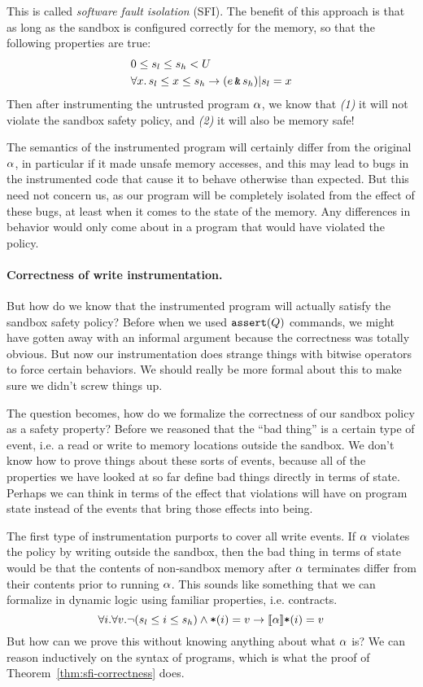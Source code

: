 \documentclass[11pt,twoside]{scrartcl}
\begin{document}
This is called \emph{software fault isolation} (SFI).
The benefit of this approach is that as long as the sandbox is configured correctly for the memory, so that the following properties are true:
\begin{align}
& 0 \le s_l \le s_h < U \\
& \forall x.\, s_l \le x \le s_h \rightarrow (e \operatorname{\texttt{\upshape \&}} s_h) | s_l = x
\end{align}
Then after instrumenting the untrusted program $\alpha$, we know that \emph{(1)} it will not violate the sandbox safety policy, and \emph{(2)} it will also be memory safe! 

The semantics of the instrumented program will certainly differ from the original $\alpha$, in particular if it made unsafe memory accesses, and this may lead to bugs in the instrumented code that cause it to behave otherwise than expected. But this need not concern us, as our program will be completely isolated from the effect of these bugs, at least when it comes to the state of the memory.
Any differences in behavior would only come about in a program that would have violated the policy.

\paragraph{Correctness of write instrumentation.} But how do we know that the instrumented program will actually satisfy the sandbox safety policy? Before when we used $\texttt{\upshape assert}(Q)$ commands, we might have gotten away with an informal argument because the correctness was totally obvious. But now our instrumentation does strange things with bitwise operators to force certain behaviors. We should really be more formal about this to make sure we didn't screw things up.

The question becomes, how do we formalize the correctness of our sandbox policy as a safety property? Before we reasoned that the ``bad thing'' is a certain type of event, i.e. a read or write to memory locations outside the sandbox. We don't know how to prove things about these sorts of events, because all of the properties we have looked at so far define bad things  directly in terms of state. Perhaps we can think in terms of the effect that violations will have on program state instead of the events that bring those effects into being.

The first type of instrumentation purports to cover all write events. If $\alpha$ violates the policy by writing outside the sandbox, then the bad thing in terms of state would be that the contents of non-sandbox memory after $\alpha$ terminates differ from their contents prior to running $\alpha$. This sounds like something that we can formalize in dynamic logic using familiar properties, i.e. contracts.
\begin{equation}
\label{eq:sfi-integrity}
\forall i . \forall v . \lnot(s_l \le i \le s_h)  \land \pderef{i}=v \limply \dbox{\asprg}{\pderef{i}=v}
\end{equation}
But how can we prove this without knowing anything about what $\alpha$ is? We can reason inductively on the syntax of programs, which is what the proof of Theorem~\ref{thm:sfi-correctness} does.
\end{document}
